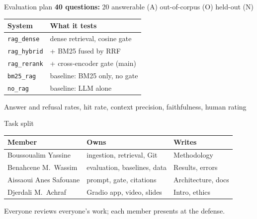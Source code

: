 \documentclass[12pt,aspectratio=169]{beamer}
\begin{document}
\begin{frame}{Evaluation plan}
  \textbf{40 questions:} 20 answerable (A)  out-of-corpus (O)  held-out (N)
  \medskip

  \begin{tabular}{@{}ll@{}}
    \toprule
    System & What it tests \\
    \midrule
    \texttt{rag\_dense} & dense retrieval, cosine gate \\
    \texttt{rag\_hybrid} & + BM25 fused by RRF \\
    \texttt{rag\_rerank} & + cross-encoder gate (main) \\
    \texttt{bm25\_rag} & baseline: BM25 only, no gate \\
    \texttt{no\_rag} & baseline: LLM alone \\
    \bottomrule
  \end{tabular}
  \medskip

  \small Answer and refusal rates, hit rate, context precision, faithfulness, human rating
\end{frame}

\begin{frame}{Task split}
  \begin{tabular}{@{}lll@{}}
    \toprule
    Member & Owns & Writes \\
    \midrule
    Boussoualim Yassine & ingestion, retrieval, Git & Methodology \\
    Benahcene M.\ Wassim & evaluation, baselines, data & Results, errors \\
    Aissaoui Anes Safouane & prompt, gate, citations & Architecture, docs \\
    Djerdali M.\ Achraf & Gradio app, video, slides & Intro, ethics \\
    \bottomrule
  \end{tabular}
  \bigskip

  \small Everyone reviews everyone's work; each member presents at the defense.
\end{frame}
\end{document}

